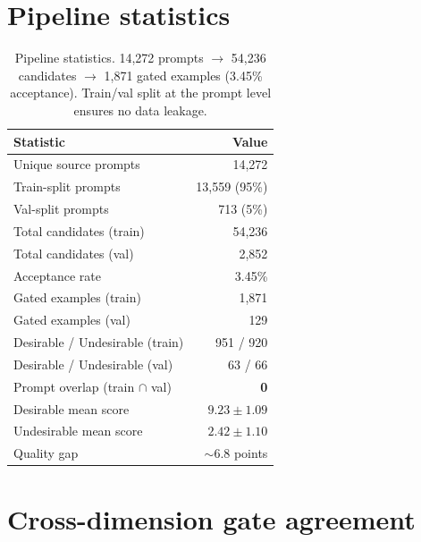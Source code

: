 \documentclass{article}
\begin{document}
\section{Pipeline statistics}
\label{app:pipeline}

\begin{table}[h]
\centering
\caption{Pipeline statistics. 14,272 prompts $\rightarrow$ 54,236 candidates $\rightarrow$ 1,871 gated examples (3.45\% acceptance). Train/val split at the prompt level ensures no data leakage.}
\label{tab:pipeline_stats}
\vspace{0.5em}
\begin{tabular}{l r}
\toprule
\textbf{Statistic} & \textbf{Value} \\
\midrule
Unique source prompts & 14,272 \\
\quad Train-split prompts & 13,559 (95\%) \\
\quad Val-split prompts & 713 (5\%) \\
Total candidates (train) & 54,236 \\
Total candidates (val) & 2,852 \\
Acceptance rate & 3.45\% \\
Gated examples (train) & 1,871 \\
Gated examples (val) & 129 \\
\quad Desirable / Undesirable (train) & 951 / 920 \\
\quad Desirable / Undesirable (val) & 63 / 66 \\
Prompt overlap (train $\cap$ val) & \textbf{0} \\
Desirable mean score & $9.23 \pm 1.09$ \\
Undesirable mean score & $2.42 \pm 1.10$ \\
Quality gap & $\sim$6.8 points \\
\bottomrule
\end{tabular}
\end{table}

\section{Cross-dimension gate agreement}
\label{app:agreement}
\end{document}
